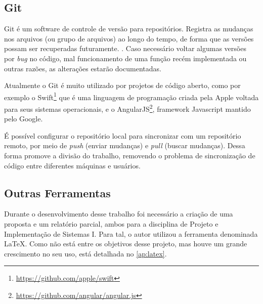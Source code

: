 \subsection{Git}\label{sec:git}

Git é um software de controle de versão para repositórios. Registra as mudanças nos arquivos (ou grupo de arquivos) ao longo do tempo, de forma que as versões possam ser recuperadas futuramente. \cite{pro-git}. Caso necessário voltar algumas versões por \textit{bug} no código, mal funcionamento de uma função recém implementada ou outras razões, as alterações estarão documentadas.

Atualmente o Git é muito utilizado por projetos de código aberto, como por exemplo o Swift\footnote{\url{https://github.com/apple/swift}} que é uma linguagem de programação criada pela Apple voltada para seus sistemas operacionais, e o AngularJS\footnote{\url{https://github.com/angular/angular.js}}, framework Javascript mantido pelo Google.

É possível configurar o repositório local para sincronizar com um repositório remoto, por meio de \textit{push} (enviar mudanças) e \textit{pull} (buscar mudanças). Dessa forma promove a divisão do trabalho, removendo o problema de sincronização de código entre diferentes máquinas e usuários.


\subsection{Outras Ferramentas}\label{sec:outras-ferramentas}

Durante o desenvolvimento desse trabalho foi necessário a criação de uma proposta e um relatório parcial, ambos para a disciplina de Projeto e Implementação de Sistemas I. Para tal, o autor utilizou a ferramenta denominada LaTeX. Como não está entre os objetivos desse projeto, mas houve um grande crescimento no seu uso, está detalhada no \autoref{ap:latex}.



